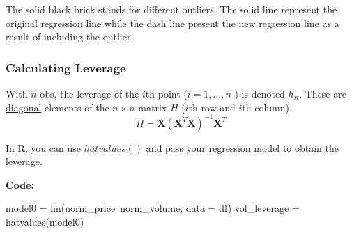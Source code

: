 \documentclass[12pt]{article}
\begin{document}
\begin{figure}[H]
\end{figure}



The solid black brick stands for different outliers. The solid line
represent the original regression line while the dash line present
the new regression line as a result of including the outlier.




\subsubsection{Calculating Leverage}


With $ n $ obs, the leverage of the $ i $th point ($ i = 1,...,n $ )
is denoted $ h_{ii} $. These are {\underline {diagonal}} elements
of the $ n  \times n $ matrix $ H $ ($ i $th row and $ i $th column).
\begin{equation*}
H = \bm{X}(\bm{X}^{T}\bm{X})^{ - 1}\bm{X}^{T}
\end{equation*}


In R, you can use $ hatvalues() $ and pass your regression model to
obtain the leverage.

{\textbf {Code:}}\\
\begin{rc}
model0 = lm(norm_price~norm_volume, data = df)
vol_leverage = hatvalues(model0)
\end{rc}
\end{document}
